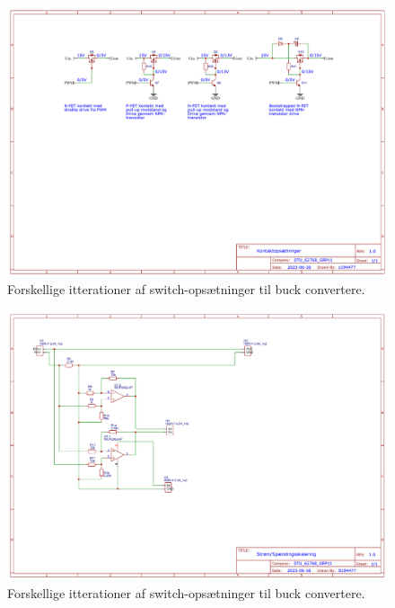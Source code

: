     \begin{figure}[H]
    \includegraphics[width=\textwidth]{Dokumentation/Figures/PV_Converter switches.png}
    \caption{Forskellige itterationer af switch-opsætninger til buck convertere.}
    \end{figure}

    \begin{figure}[H]
    \includegraphics[width=\textwidth]{Dokumentation/Figures/PV_strøm-spændingsmåler.png}
    \caption{Forskellige itterationer af switch-opsætninger til buck convertere.}
    \end{figure}
